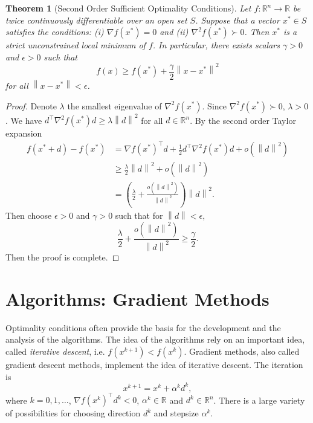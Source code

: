 \documentclass[12pt,a4paper]{article}
\numberwithin{equation}{section}
\theoremstyle{mystyle}
\newtheorem{theorem}[definition]{Theorem}
\newcommand{\R}{\mathbb{R}}
\newcommand{\grad}{\nabla}
\newcommand{\T}{\top}
\newcommand{\norm}[1]{\left\lVert #1 \right\rVert}
\begin{document}
	\begin{theorem}[Second Order Sufficient Optimality Conditions]
		Let $f:\R^n \to \R$ be twice continuously differentiable over an open set $S$. Suppose that a vector $x^*\in S$ satisfies the conditions: (i) $\grad f(x^*)=0$ and (ii) $\grad^2 f(x^*)\succ 0$. Then $x^*$ is a strict unconstrained local minimum of $f$. In particular, there exists scalars $\gamma>0$ and $\epsilon>0$ such that
		$$
		f(x)\geq f(x^*)+\frac{\gamma}{2}\norm{x-x^*}^2
		$$
		for all $\norm{x-x^*}<\epsilon$.
	\end{theorem}
	\begin{proof}
		Denote $\lambda$ the smallest eigenvalue of $\grad^2 f(x^*)$. Since $\grad^2 f(x^*)\succ 0$, $\lambda >0$. We have $d^\T \grad^2 f(x^*)d \geq \lambda \norm{d}^2$ for all $d\in \R^n$. By the second order Taylor expansion
		\begin{align*}
			f(x^*+d)-f(x^*)&=\grad f(x^*)^\T d + \frac{1}{2} d^\T \grad^2 f(x^*)d+o(\norm{d}^2)\\
			&\geq \frac{\lambda}{2}\norm{d}^2+o(\norm{d}^2)\\
			&=\left(\frac{\lambda}{2}+\frac{o(\norm{d}^2)}{\norm{d}^2}\right)\norm{d}^2.
		\end{align*}
		Then choose $\epsilon>0$ and $\gamma>0$ such that for $\norm{d}<\epsilon$,
		$$
		\frac{\lambda}{2}+\frac{o(\norm{d}^2)}{\norm{d}^2}\geq \frac{\gamma}{2}.
		$$
		Then the proof is complete.
	\end{proof}



	\section{Algorithms: Gradient Methods}
	Optimality conditions often provide the basis for the development and the analysis of the algorithms. The idea of the algorithms rely on an important idea, called \emph{iterative descent}, i.e. $f(x^{k+1})<f(x^k)$. Gradient methods, also called gradient descent methods, implement the idea of iterative descent. The iteration is 
	\begin{equation}
		x^{k+1} = x^k + \alpha^k d^k,
	\end{equation}
	where $k=0,1,\dots$, $\grad f(x^k)^\T d^k<0$, $\alpha^k\in \R$ and $d^k\in \R^n$. There is a large variety of possibilities for choosing direction $d^k$ and stepsize $\alpha^k$.
	
\end{document}
